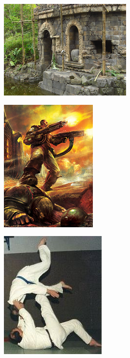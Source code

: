 \begin{figure}
	\begin{center}
		\includegraphics[width=\figwidth]{pics/6/42.png}
	\end{center}
\end{figure}

\begin{figure}
	\begin{center}
		\includegraphics[width=\figwidth]{pics/6/43.png}
	\end{center}
\end{figure}

\begin{figure}
	\begin{center}
		\includegraphics[width=\figwidth]{pics/6/44.png}
	\end{center}
\end{figure}

